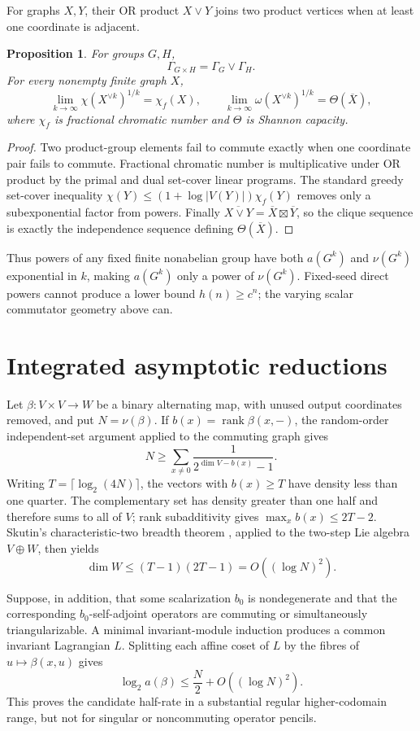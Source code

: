 \documentclass[11pt]{article}
\newtheorem{proposition}[theorem]{Proposition}
\theoremstyle{remark}
\newcommand{\nuG}{\nu}
\newcommand{\aG}{a}
\begin{document}
For graphs $X,Y$, their OR product $X\vee Y$ joins two product vertices
when at least one coordinate is adjacent.

\begin{proposition}\label{prop:products}
For groups $G,H$,
\[
 \Gamma_{G\times H}=\Gamma_G\vee\Gamma_H.
\]
For every nonempty finite graph $X$,
\[
 \lim_{k\to\infty}\chi(X^{\vee k})^{1/k}=\chi_f(X),\qquad
 \lim_{k\to\infty}\omega(X^{\vee k})^{1/k}=\Theta(\overline X),
\]
where $\chi_f$ is fractional chromatic number and $\Theta$ is Shannon
capacity.
\end{proposition}

\begin{proof}
Two product-group elements fail to commute exactly when one coordinate pair
fails to commute.  Fractional chromatic number is multiplicative under OR
product by the primal and dual set-cover linear programs.  The standard
greedy set-cover inequality
$\chi(Y)\le(1+\log|V(Y)|)\chi_f(Y)$ removes only a subexponential factor
from powers.  Finally
$\overline{X\vee Y}=\overline X\boxtimes\overline Y$, so the clique sequence
is exactly the independence sequence defining $\Theta(\overline X)$.
\end{proof}

Thus powers of any fixed finite nonabelian group have both $\aG(G^k)$ and
$\nuG(G^k)$ exponential in $k$, making $\aG(G^k)$ only a power of
$\nuG(G^k)$.  Fixed-seed direct powers cannot produce a lower bound
$h(n)\ge c^n$; the varying scalar commutator geometry above can.

\section{Integrated asymptotic reductions}

Let $\beta:V\times V\to W$ be a binary alternating map, with unused output
coordinates removed, and put $N=\nuG(\beta)$.  If
$b(x)=\operatorname{rank}\beta(x,-)$, the random-order independent-set
argument applied to the commuting graph gives
\[
 N\ge\sum_{x\ne0}\frac{1}{2^{\dim V-b(x)}-1}.
\]
Writing $T=\lceil\log_2(4N)\rceil$, the vectors with $b(x)\ge T$ have
density less than one quarter.  The complementary set has density greater
than one half and therefore sums to all of $V$; rank subadditivity gives
$\max_xb(x)\le2T-2$.  Skutin's characteristic-two breadth theorem
\cite[Theorem~1.3]{skutin_2020}, applied to the two-step Lie algebra
$V\oplus W$, then yields
\[
 \dim W\le(T-1)(2T-1)=O((\log N)^2).
\]

Suppose, in addition, that some scalarization $b_0$ is nondegenerate and
that the corresponding $b_0$-self-adjoint operators are commuting or
simultaneously triangularizable.  A minimal invariant-module induction
produces a common invariant Lagrangian $L$.  Splitting each affine coset of
$L$ by the fibres of $u\mapsto\beta(x,u)$ gives
\[
 \log_2 a(\beta)\le\frac{N}{2}+O((\log N)^2).
\]
This proves the candidate half-rate in a substantial regular
higher-codomain range, but not for singular or noncommuting operator pencils.
\end{document}
